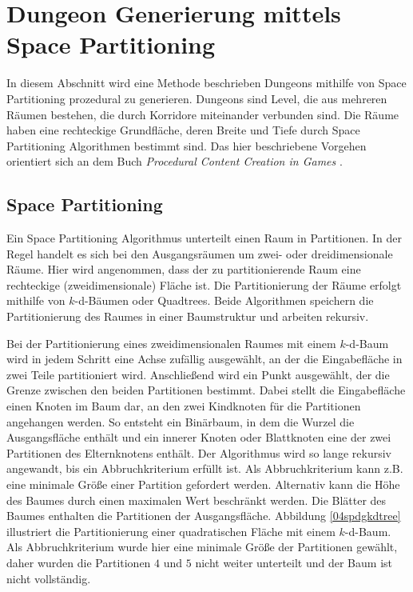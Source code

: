 \section{Dungeon Generierung mittels Space Partitioning}\label{WG:SpacePartitioning}
In diesem Abschnitt wird eine Methode beschrieben Dungeons mithilfe von Space Partitioning prozedural zu generieren. Dungeons sind Level, die aus mehreren Räumen bestehen, die durch Korridore miteinander verbunden sind. Die Räume haben eine rechteckige Grundfläche, deren Breite und Tiefe durch Space Partitioning Algorithmen bestimmt sind. Das hier beschriebene Vorgehen orientiert sich an dem Buch \textit{Procedural Content Creation in Games} \cite{Shaker2016}.

\subsection{Space Partitioning}
Ein Space Partitioning Algorithmus unterteilt einen Raum in Partitionen. In der Regel handelt es sich bei den Ausgangsräumen um zwei- oder dreidimensionale Räume. Hier wird angenommen, dass der zu partitionierende Raum eine rechteckige (zweidimensionale) Fläche ist. Die Partitionierung der Räume erfolgt mithilfe von $k$-d-Bäumen oder Quadtrees. Beide Algorithmen speichern die Partitionierung des Raumes in einer Baumstruktur und arbeiten rekursiv.

Bei der Partitionierung eines zweidimensionalen Raumes mit einem $k$-d-Baum wird in jedem Schritt eine Achse zufällig ausgewählt, an der die Eingabefläche in zwei Teile partitioniert wird. Anschließend wird ein Punkt ausgewählt, der die Grenze zwischen den beiden Partitionen bestimmt. Dabei stellt die Eingabefläche einen Knoten im Baum dar, an den zwei Kindknoten für die Partitionen angehangen werden. So entsteht ein Binärbaum, in dem die Wurzel die Ausgangsfläche enthält und ein innerer Knoten oder Blattknoten eine der zwei Partitionen des Elternknotens enthält. Der Algorithmus wird so lange rekursiv angewandt, bis ein Abbruchkriterium erfüllt ist. Als Abbruchkriterium kann z.B. eine minimale Größe einer Partition gefordert werden. Alternativ kann die Höhe des Baumes durch einen maximalen Wert beschränkt werden. Die Blätter des Baumes enthalten die Partitionen der Ausgangsfläche. Abbildung \ref{04spdgkdtree} illustriert die Partitionierung einer quadratischen Fläche mit einem $k$-d-Baum. Als Abbruchkriterium wurde hier eine minimale Größe der Partitionen gewählt, daher wurden die Partitionen $4$ und $5$ nicht weiter unterteilt und der Baum ist nicht vollständig. 

